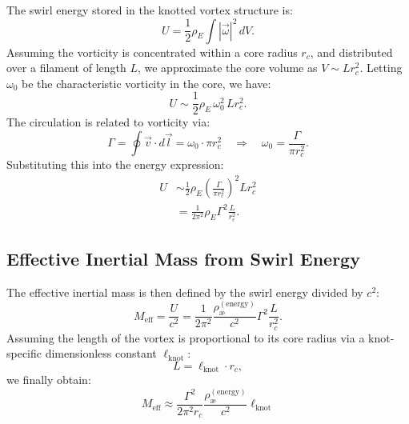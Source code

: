   The swirl energy stored in the knotted vortex structure is:
  \begin{equation}
    U = \frac{1}{2} \rho_{\scriptscriptstyle\boldsymbol\!E}\int |\vec{\omega}|^2 \, dV.
  \end{equation}
  Assuming the vorticity is concentrated within a core radius $r_c$, and distributed over a filament of length $L$, we approximate the core volume as $V \sim L r_c^2$. Letting $\omega_0$ be the characteristic vorticity in the core, we have:
  \begin{equation}
    U \sim \frac{1}{2} \rho_{\scriptscriptstyle\boldsymbol\!E}\, \omega_0^2 \, L r_c^2.
  \end{equation}
  The circulation is related to vorticity via:
  \begin{equation}
    \Gamma = \oint \vec{v} \cdot d\vec{l} = \omega_0 \cdot \pi r_c^2 \quad \Rightarrow \quad \omega_0 = \frac{\Gamma}{\pi r_c^2}.
  \end{equation}
  Substituting this into the energy expression:
  \begin{align}
    U &\sim \frac{1}{2} \rho_{\scriptscriptstyle\boldsymbol\!E}\left( \frac{\Gamma}{\pi r_c^2} \right)^2 L r_c^2 \\
    &= \frac{1}{2\pi^2} \rho_{\scriptscriptstyle\boldsymbol\!E}\Gamma^2 \frac{L}{r_c^2}.
  \end{align}

  \subsection{Effective Inertial Mass from Swirl Energy}

  The effective inertial mass is then defined by the swirl energy divided by $c^2$:
  \begin{equation}
    M_\text{eff} = \frac{U}{c^2} = \frac{1}{2\pi^2} \frac{\rho_\text{\ae}^{(\text{energy})}}{c^2} \Gamma^2 \frac{L}{r_c^2}.
  \end{equation}
  Assuming the length of the vortex is proportional to its core radius via a knot-specific dimensionless constant $\ell_\text{knot}$:
  \begin{equation}
    L = \ell_\text{knot} \cdot r_c,
  \end{equation}
  we finally obtain:
  \begin{equation}
    \boxed{
      M_\text{eff} \approx \frac{\Gamma^2}{2\pi^2 r_c} \frac{\rho_\text{\ae}^{(\text{energy})}}{c^2} \ell_\text{knot}
    }
  \end{equation}

